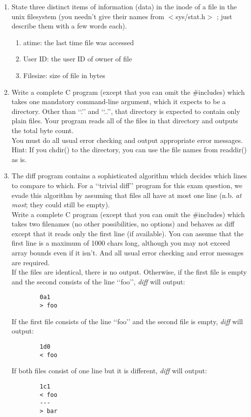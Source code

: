 \documentclass[11pt]{article}
\begin{document}
\begin{enumerate}
	\newpage
	\item State three distinct items of information (data) in the inode of a file in the unix filesystem (you needn’t give their names from $ < $sys/stat.h$ > $ ; just describe them with a few words each).
		\begin{enumerate}
			\item atime: the last time file was accessed
			\item User ID: the user ID of owner of file
			\item Filesize: size of file in bytes
		\end{enumerate}
	
	\item Write a complete C program (except that you can omit the \#includes) which takes one mandatory command-line argument, which it expects to be a directory. Other than ‘‘.’’ and ‘‘..’’, that directory is expected to contain only plain files. Your program reads all of the files in that directory and outputs the total byte count.\\
	You must do all usual error checking and output appropriate error messages.\\
	Hint: If you chdir() to the directory, you can use the file names from readdir() as is.
		
		
	\newpage
	\item The diff program contains a sophisticated algorithm which decides which lines to compare to which. For a ‘‘trivial diff’’ program for this exam question, we evade this algorithm by assuming that files all have at most one line (n.b. \textit{at most}; they could still be empty).\\
	Write a complete C program (except that you can omit the \#includes) which takes two filenames (no other possibilities, no options) and behaves as diff except that it reads only the first line (if available). You can assume that the first line is a maximum of 1000 chars long, although you may not exceed array bounds even if it isn’t. And all usual error checking and error messages are required.\\
	If the files are identical, there is no output. Otherwise, if the first file is empty and the second consists of the line ‘‘foo’’, \textit{diff} will output:
	\begin{lstlisting}
		0a1
		> foo\end{lstlisting}
	If the first file consists of the line ‘‘foo’’ and the second file is empty, \textit{diff} will output:
	\begin{lstlisting}
		1d0
		< foo\end{lstlisting}
	If both files consist of one line but it is different, \textit{diff} will output:
	\begin{lstlisting}
		1c1
		< foo
		---
		> bar\end{lstlisting}
		
		

\end{enumerate}
\end{document}
